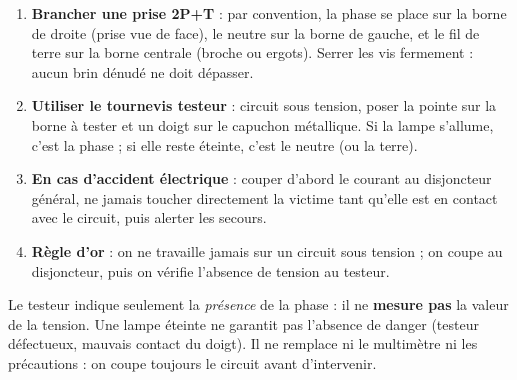 \documentclass[11pt]{article}
\begin{document}
\begin{methode}
\begin{enumerate}
  \item \textbf{Brancher une prise 2P+T} : par convention, la phase se place sur la borne de droite (prise vue de face), le neutre sur la borne de gauche, et le fil de terre sur la borne centrale (broche ou ergots). Serrer les vis fermement : aucun brin dénudé ne doit dépasser.
  \item \textbf{Utiliser le tournevis testeur} : circuit sous tension, poser la pointe sur la borne à tester et un doigt sur le capuchon métallique. Si la lampe s'allume, c'est la phase ; si elle reste éteinte, c'est le neutre (ou la terre).
  \item \textbf{En cas d'accident électrique} : couper d'abord le courant au disjoncteur général, ne jamais toucher directement la victime tant qu'elle est en contact avec le circuit, puis alerter les secours.
  \item \textbf{Règle d'or} : on ne travaille jamais sur un circuit sous tension ; on coupe au disjoncteur, puis on vérifie l'absence de tension au testeur.
\end{enumerate}
\end{methode}

\begin{attention}
Le testeur indique seulement la \emph{présence} de la phase : il ne \textbf{mesure pas} la valeur de la tension. Une lampe éteinte ne garantit pas l'absence de danger (testeur défectueux, mauvais contact du doigt). Il ne remplace ni le multimètre ni les précautions : on coupe toujours le circuit avant d'intervenir.
\end{attention}
\end{document}
